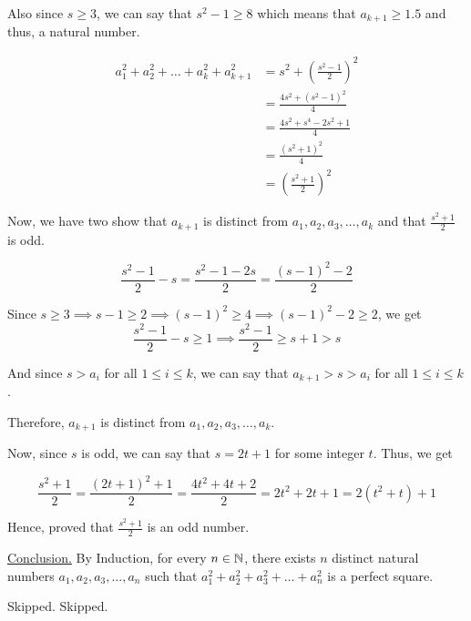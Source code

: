 Also since $s \geq 3$, we can say that $s^2 - 1 \geq 8$ which means that $a_{k+1} \geq 1.5$ and thus, a natural number.

\begin{align*}
a_1^2 + a_2^2 + \ldots +a_k^2 + a_{k+1}^2 
 &= s^2 + \left( \frac{s^2-1}{2} \right)^2 \\
 &= \frac{4s^2 + (s^2-1)^2}{4} \\
 &= \frac{4s^2 + s^4 - 2s^2 + 1}{4} \\
 &= \frac{(s^2+1)^2}{4} \\
 &= \left( \frac{s^2+1}{2} \right)^2
\end{align*}

Now, we have two show that $a_{k+1}$ is distinct from $a_1, a_2, a_3, \ldots, a_k$ and that $\displaystyle \frac{s^2+1}{2}$ is odd.

$$\frac{s^2-1}{2} - s = \frac{s^2-1-2s}{2} = \frac{(s-1)^2 - 2}{2}$$

Since $s \geq 3 \implies s-1 \geq 2 \implies (s-1)^2 \geq 4 \implies (s-1)^2 - 2 \geq 2$, we get
$$\frac{s^2-1}{2} - s \geq 1 \implies \frac{s^2-1}{2} \geq s+1 > s$$

And since $s > a_i$ for all $1 \leq i \leq k$, we can say that $a_{k+1} > s > a_i$ for all $1 \leq i \leq k$.

Therefore, $a_{k+1}$ is distinct from $a_1, a_2, a_3, \ldots, a_k$.

Now, since $s$ is odd, we can say that $s = 2t+1$ for some integer $t$. Thus, we get

$$\frac{s^2+1}{2} = \frac{(2t+1)^2+1}{2} = \frac{4t^2 + 4t + 2}{2} = 2t^2  + 2t + 1 = 2(t^2+t)+1$$

Hence, proved that $\displaystyle \frac{s^2+1}{2}$ is an odd number.

\underline{Conclusion.} By Induction, for every $n \in \mathbb{N}$, there exists $n$ distinct natural numbers $a_1, a_2, a_3, \ldots, a_n$ such that $a_1^2 + a_2^2 + a_3^2 + \ldots + a_n^2$ is a perfect square.

\es

\bp Skipped. \ep
\bp Skipped. \ep
